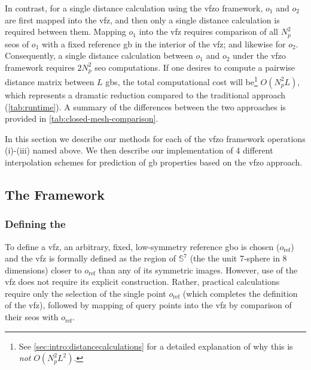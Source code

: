 \documentclass[final,twocolumn,12pt]{elsarticle}
\begin{document}
In contrast, for a single distance calculation using the \gls{vfzo} framework, $o_1$ and $o_2$ are first mapped into the \gls{vfz}, and then only a single distance calculation is required between them. Mapping $o_1$ into the \gls{vfz} requires comparison of all $N_p^2$ \glspl{seo} of $o_1$ with a fixed reference \gls{gb} in the interior of the \gls{vfz}; and likewise for $o_2$. Consequently, a single distance calculation between $o_1$ and $o_2$ under the \gls{vfzo} framework requires $2N_p^2$ \gls{seo} computations. If one desires to compute a pairwise distance matrix between $L$ \glspl{gb}, the total computational cost will be\footnote{See \cref{sec:intro:distancecalculations} for a detailed explanation of why this is \emph{not} $O(N_p^2L^2)$.} $O(N_p^2L)$, which represents a dramatic reduction compared to the traditional approach (\cref{tab:runtime}). A summary of the differences between the two approaches is provided in \cref{tab:closed-mesh-comparison}.

In this section we describe our methods for each of the \gls{vfzo} framework operations (i)-(iii) named above. We then describe our implementation of 4 different interpolation schemes for prediction of \gls{gb} properties based on the \gls{vfzo} approach.

\subsection{The  Framework}
\label{sec:methods:framework}

\subsubsection{Defining the }
\label{sec:methods:vfz}


To define a \gls{vfz}, an arbitrary, fixed, low-symmetry reference \gls{gbo} is chosen ($o_{\text{ref}}$) and the \gls{vfz} is formally defined as the region of $\mathbb{S}^7$ (the the unit 7-sphere in 8 dimensions) closer to $o_{\text{ref}}$ than any of its symmetric images. However, use of the \gls{vfz} does not require its explicit construction. Rather, practical calculations require only the selection of the single point $o_{\text{ref}}$ (which completes the definition of the \gls{vfz}), followed by mapping of query points into the \gls{vfz} by comparison of their \glspl{seo} with $o_{\text{ref}}$.
\end{document}
